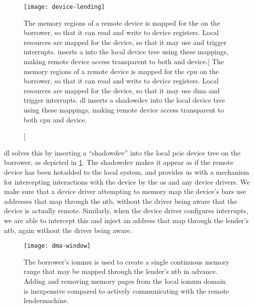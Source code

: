 \begin{figure}
    \centering
    \texttt{[image: device-lending]}
    \caption
    [The memory regions of a remote device is mapped for the  on the borrower, so that it can read and write to device registers. Local resources are mapped for the device, so that it may use  and trigger interrupts.  inserts a  into the local device tree using these mappings, making remote device access transparent to both  and device.]
    {The memory regions of a remote device is mapped for the \gls{cpu} on the borrower, so that it can read and write to device registers. Local resources are mapped for the device, so that it may use \gls{dma} and trigger interrupts. \Gls{dl} inserts a \gls{shadowdev} into the local device tree using these mappings, making remote device access transparent to both \gls{cpu} and device.}
    \label{fig:device-lending}
\end{figure}


\Gls{dl} solves this by inserting a ``\gls{shadowdev}'' into the local \gls{pcie} device tree on the \gls{borrower}, as depicted in \cref{fig:device-lending}. 
%
The \gls{shadowdev} makes it appear as if the remote device has been \gls{hotadded} to the local system, and provides us with a mechanism for intercepting interactions with the device by the \gls{os} and any device drivers. 
%
We make sure that a device driver attempting to memory map the device's \glspl{bar} use addresses that map through the \gls{ntb}, without the driver being aware that the device is actually remote.
%
Similarly, when the device driver configures interrupts, we are able to intercept this and inject an address that map through the \gls{lender}'s \gls{ntb}, again without the driver being aware.



\begin{figure}
    \centering
    \texttt{[image: dma-window]}
    \caption[The borrower's  is used to create a single continuous memory range that may be mapped through the lender's  in advance. Adding and removing memory pages from the local  domain is inexpensive compared to actively communicating with the remote lender~machine]
    {The \gls{borrower}'s \gls{iommu} is used to create a single continuous memory range that may be mapped through the \gls{lender}'s \gls{ntb} in advance. Adding and removing memory pages from the local \gls{iommu} domain is inexpensive compared to actively communicating with the remote \gls{lendermachine}.}
    \label{fig:dma-window}
\end{figure}


